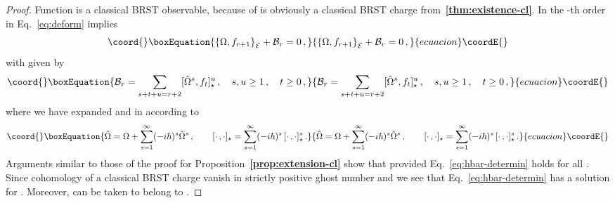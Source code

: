 \documentclass[a4paper,11pt]{amsart}
\numberwithin{thm}{section} %
\numberwithin{equation}{section} %
\numberwithin{figure}{section} %
\providecommand{\bref}[1]{{\bf \ref{#1}}}
\def\ih{-i\hbar}
\providecommand{\qcommut}[2]{[#1,#2]_\star}
\providecommand{\pb}[2]{\left\{{}#1{},{}#2{}\right\}}
\providecommand{\gh}[1]{{\rm gh}(#1)}
\renewcommand{\:}{{\rm\, :\,}}
\def\cB{{\mathcal B}}
\def\qA{{\hat{\mathfrak A}}}
\def\E{{ \mathcal E}}
\begin{document}
\begin{proof}
Function \coordHE{} is a classical BRST observable, because of
\coordHE{} is obviously a classical
BRST charge from~\bref{thm:existence-cl}.  In the \coordHE{}-th order in
\myHighlight{$\hbar$}\coordHE{} Eq.~\eqref{eq:deform} implies
\begin{equation}\coord{}\boxEquation{
\label{eq:hbar-determin}
  \pb{\Omega}{f_{r+1}}_\E+\cB_r=0\,,
}{
\pb{\Omega}{f_{r+1}}_\E+\cB_r=0\,,
}{ecuacion}\coordE{}\end{equation}
with \myHighlight{$\cB_r$}\coordHE{} given by
\begin{equation}\coord{}\boxEquation{
\cB_r=\sum_{s+t+u=r+2} \qcommut{{\hat\Omega}^s}{f_t}^u\,, \quad s,u\geq
1\,, \quad t\geq 0\,,
}{
\cB_r=\sum_{s+t+u=r+2} \qcommut{{\hat\Omega}^s}{f_t}^u\,, \quad s,u\geq
1\,, \quad t\geq 0\,,
}{ecuacion}\coordE{}\end{equation}
where we have expanded \myHighlight{${\hat\Omega}$}\coordHE{} and \myHighlight{$\qcommut{\,}{}$}\coordHE{} in \myHighlight{$\hbar$}\coordHE{}
according to
\begin{equation}\coord{}\boxEquation{
{\hat\Omega}=\Omega+\sum^\infty_{s=1}(\ih)^s {\hat\Omega}^s\,,\qquad
\qcommut{\cdot\,}{\cdot}=\sum^\infty_{s=1}(\ih)^s \,
\qcommut{\cdot\,}{\cdot}^s\,.
}{
{\hat\Omega}=\Omega+\sum^\infty_{s=1}(\ih)^s {\hat\Omega}^s\,,\qquad
\qcommut{\cdot\,}{\cdot}=\sum^\infty_{s=1}(\ih)^s \,
\qcommut{\cdot\,}{\cdot}^s\,.
}{ecuacion}\coordE{}\end{equation}
Arguments similar to those of the proof for
Proposition~\bref{prop:extension-cl} show that
\myHighlight{$\pb{\Omega}{\cB^p}_\E=0$}\coordHE{} provided Eq.~\eqref{eq:hbar-determin} holds
for all \coordHE{}. Since cohomology of a classical BRST charge
vanish in strictly positive ghost number and \myHighlight{$\gh{\cB_{r+1}}\geq 1$}\coordHE{} we
see that Eq.~\eqref{eq:hbar-determin} has a solution for \coordHE{}.
Moreover, \coordHE{} can be taken to belong to \myHighlight{$\qA$}\coordHE{}.



\end{proof}
\end{document}
